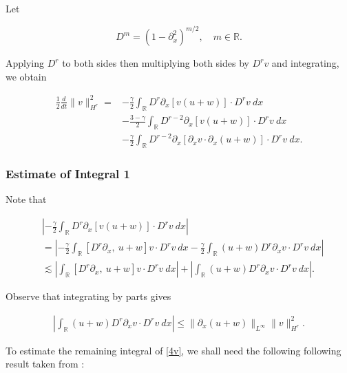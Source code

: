 \documentclass[handout]{beamer}
\numberwithin{equation}{section}
\newcommand{\rr}{\mathbb{R}}
\newcommand{\p}{\partial}
\begin{document}
\begin{frame}
Let

\begin{equation*}
    D^{m} = (1 - \p_x^2)^{m/2}, \quad m \in \rr.
\end{equation*}

Applying $D^r$ to both sides then 
multiplying both sides by $D^r v$ and integrating, we obtain


\begin{equation*}
\begin{split}
 \frac{1}{2} \frac{d}{dt} \|v\|_{H^r}^2
 = & -\frac{\gamma}{2} \int_{\rr} D^r \p_x [v(u+w)] \cdot
D^r v \ dx
\\
& - \frac{3-\gamma}{2} \int_{\rr}  D^{r -2}
\p_x[v(u+w)] \cdot
D^r v \ dx  
\\
& - \frac{\gamma}{2} \int_{\rr} D^{r 
-2} \p_x [ \p_x v
\cdot \p_x (u+w)]\cdot D^r v \ dx.
\label{2v}
\end{split}
\end{equation*}
\end{frame}


\begin{frame}
\frametitle{Estimate of Integral 1} Note that


\begin{equation*}
\begin{split}
& \left |  -\frac{\gamma}{2} \int_{\rr} D^r \p_x [v(u+w)] \cdot
D^r v \ dx \right |
\\
& =
\left |
-\frac{\gamma}{2} \int_{\rr} \left[ D^r \p_x, \ u+w \right]v \cdot
D^r v \ dx - \frac{\gamma}{2} \int_{\rr} (u+w) D^r
\p_x v \cdot D^r v\ dx
\right | \\
& \lesssim \left |
\int_{\rr} \left[ D^r \p_x, \ u+w \right]v \cdot
D^r v \ dx \right |
+ \left | \int_{\rr} (u+w) D^r \p_x v
\cdot D^r v\
dx \right |.
\label{4v}
\end{split}
\end{equation*}


Observe that integrating by parts gives


\begin{equation*}
\begin{split}
\left | \int_{\rr} (u+w) D^r \p_x v \cdot
D^r v \ dx \right |
\le \|\p_x (u+w)\|_{L^\infty}
\|v\|_{H^r}^2.
\label{4'v}
\end{split}
\end{equation*}


To estimate the remaining integral of \eqref{4v}, we shall need the following
following result taken from \cite{Himonas:2010p1187}:

\end{frame}
\end{document}
